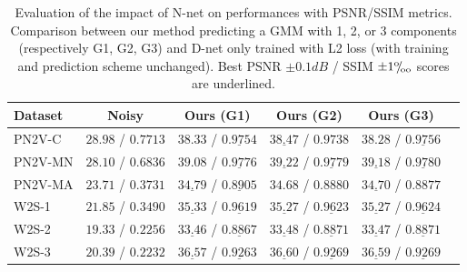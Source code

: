 \documentclass{article}
\def\permille{\ensuremath{{}^\text{o}\mkern-5mu/\mkern-3mu_\text{oo}}}
\begin{document}
\begin{table}[ht]
\caption{Evaluation of the impact of N-net on performances with PSNR/SSIM metrics. Comparison between our method predicting a GMM with 1, 2, or 3 components (respectively G1, G2, G3) and D-net only trained with L2 loss (with training and prediction scheme unchanged).
Best PSNR $\pm0.1dB$ / SSIM $\pm1\permille$ scores are underlined.}
\label{si:table:results}
\begin{center}
\begin{sc}
\begin{tabular}{lccccc}
\toprule
Dataset & Noisy & Ours (G1) & Ours (G2) & Ours (G3) \\
\midrule
PN2V-C & $28.98$ / $0.7713$ & $38.33$ / $\underline{0.9754}$ & $\underline{38.47}$ / $0.9738$ & $38.28$ / $\underline{0.9756}$ \\
PN2V-MN & $28.10$ / $0.6836$ & $39.08$ / $\underline{0.9776}$ & $\underline{39.22}$ / $\underline{0.9779}$ & $\underline{39.18}$ / $\underline{0.9780}$ \\
PN2V-MA & $23.71$ / $0.3731$ & $\underline{34.79}$ / $\underline{0.8905}$ & $34.68$ / $0.8880$ & $\underline{34.70}$ / $0.8877$ \\
W2S-1 & $21.85$ / $0.3490$ & $\underline{35.33}$ / $\underline{0.9619}$ & $\underline{35.27}$ / $\underline{0.9623}$ & $\underline{35.27}$ / $\underline{0.9624}$ \\
W2S-2 & $19.33$ / $0.2256$ & $\underline{33.46}$ / $\underline{0.8867}$ & $\underline{33.48}$ / $\underline{0.8871}$ & $\underline{33.47}$ / $\underline{0.8871}$ \\
W2S-3 & $20.39$ / $0.2232$ & $\underline{36.57}$ / $\underline{0.9263}$ & $\underline{36.60}$ / $\underline{0.9269}$ & $\underline{36.59}$ / $\underline{0.9269}$ \\
\bottomrule
\end{tabular}
\end{sc}
\end{center}
\end{table}
\FloatBarrier
\end{document}
